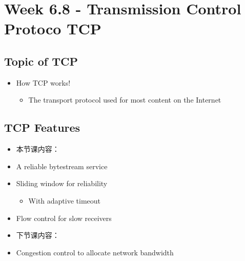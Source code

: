 \documentclass[12pt]{ctexart}   %
\begin{document}
\section{Week 6.8 - Transmission Control Protoco TCP}
	\subsection{Topic of TCP }
	\begin{itemize}
		\item How TCP works!
		\begin{itemize}
			\item The transport protocol used for most content on the Internet
		\end{itemize}
	\end{itemize}
	
	\subsection{TCP Features}
	\begin{itemize}
		\item {\color{red} 本节课内容：}
		\item A reliable bytestream service
		\item Sliding window for reliability
		\begin{itemize}
			\item With adaptive timeout
		\end{itemize}
		\item Flow control for slow receivers
		
		\item {\color{red} 下节课内容：}
		\item Congestion control to allocate network bandwidth
	\end{itemize}
	
\end{document}
